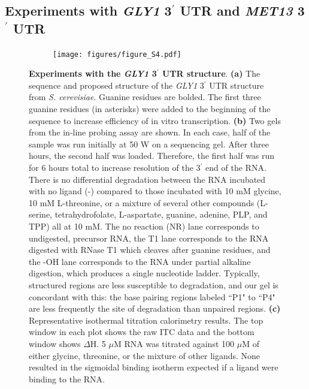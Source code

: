 \documentclass[12pt]{report}
\begin{document}
\subsection{Experiments with \textit{GLY1} 3$^\prime$ UTR and \textit{MET13} 3$^\prime$ UTR}
\begin{figure}[h]
	\begin{subfigure}{1\textwidth}
		\center
		\texttt{[image: figures/figure\_S4.pdf]}	
	\end{subfigure}
	
	\caption[Experiments with the \textit{GLY1} 3$^\prime$ UTR structure]{\textbf{Experiments with the \textit{GLY1} 3$^\prime$ UTR structure}. \textbf{(a)} The sequence and proposed structure of the \textit{GLY1} 3$^\prime$ UTR structure from \textit{S. cerevisiae}. Guanine residues are bolded. The first three guanine residues (in asterisks) were added to the beginning of the sequence to increase efficiency of in vitro transcription. \textbf{(b)} Two gels from the in-line probing assay are shown. In each case, half of the sample was run initially at 50 W on a sequencing gel. After three hours, the second half was loaded. Therefore, the first half was run for 6 hours total to increase resolution of the 3$^\prime$ end of the RNA. There is no differential degradation between the RNA incubated with no ligand (-) compared to those incubated with 10 mM glycine, 10 mM L-threonine, or a mixture of several other compounds (L-serine, tetrahydrofolate, L-aspartate, guanine, adenine, PLP, and TPP) all at 10 mM. The no reaction (NR) lane corresponds to undigested, precursor RNA, the T1 lane corresponds to the RNA digested with RNase T1 which cleaves after guanine residues, and the -OH lane corresponds to the RNA under partial alkaline digestion, which produces a single nucleotide ladder. Typically, structured regions are less susceptible to degradation, and our gel is concordant with this: the base pairing regions labeled ``P1" to ``P4" are less frequently the site of degradation than unpaired regions. \textbf{(c)} Representative isothermal titration calorimetry results. The top window in each plot shows the raw ITC data and the bottom window shows $\Delta$H. 5 $\mu$M RNA was titrated against 100 $\mu$M of either glycine, threonine, or the mixture of other ligands. None resulted in the sigmoidal binding isotherm expected if a ligand were binding to the RNA.}
	\label{fig:S3}
\end{figure}
\end{document}
